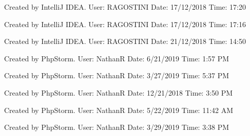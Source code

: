Created by IntelliJ I\+D\+EA. User\+: R\+A\+G\+O\+S\+T\+I\+NI Date\+: 17/12/2018 Time\+: 17\+:20

Created by IntelliJ I\+D\+EA. User\+: R\+A\+G\+O\+S\+T\+I\+NI Date\+: 17/12/2018 Time\+: 17\+:16

Created by IntelliJ I\+D\+EA. User\+: R\+A\+G\+O\+S\+T\+I\+NI Date\+: 21/12/2018 Time\+: 14\+:50

Created by Php\+Storm. User\+: NathanR Date\+: 6/21/2019 Time\+: 1\+:57 PM

Created by Php\+Storm. User\+: NathanR Date\+: 3/27/2019 Time\+: 5\+:37 PM

Created by Php\+Storm. User\+: NathanR Date\+: 12/21/2018 Time\+: 3\+:50 PM

Created by Php\+Storm. User\+: NathanR Date\+: 5/22/2019 Time\+: 11\+:42 AM

Created by Php\+Storm. User\+: NathanR Date\+: 3/29/2019 Time\+: 3\+:38 PM 